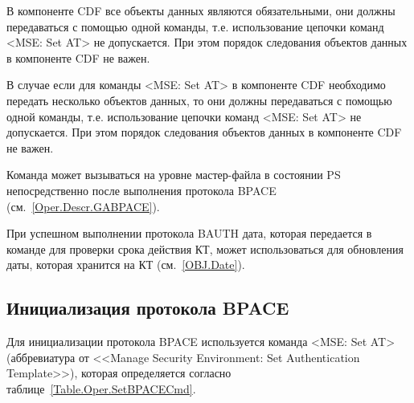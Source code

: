 В компоненте CDF все объекты данных являются обязательными, 
они должны передаваться с помощью одной команды, 
т.е. использование цепочки команд <MSE: Set AT> не допускается. 
При этом порядок следования объектов данных в компоненте CDF не важен. 

В случае если для команды <MSE: Set AT> в компоненте CDF необходимо 
передать несколько объектов данных, то они должны передаваться с помощью 
одной команды, т.е. использование цепочки команд <MSE: Set AT> не 
допускается. При этом порядок следования объектов данных в компоненте CDF 
не важен. 
\fi

Команда может вызываться на уровне мастер-файла в состоянии PS 
непосредственно после выполнения протокола BPACE (см.~\ref{Oper.Descr.GABPACE}).


При успешном выполнении протокола BAUTH дата, которая передается в команде 
для проверки срока действия КТ, может использоваться для обновления даты, 
которая хранится на КТ (см.~\ref{OBJ.Date}). 


\subsection{Инициализация протокола BPACE}
\label{Oper.Descr.SetBPACE}

Для инициализации протокола BPACE используется команда
<MSE: Set AT> (аббревиатура от <<Manage Security Environment: Set 
Authentication Template>>), 
которая определяется согласно 
таблице~\ref{Table.Oper.SetBPACECmd}.

